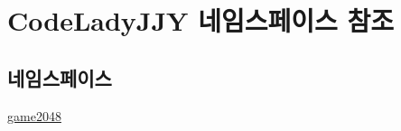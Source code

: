 \hypertarget{namespace_code_lady_j_j_y}{}\section{Code\+Lady\+J\+JY 네임스페이스 참조}
\label{namespace_code_lady_j_j_y}
\subsection*{네임스페이스}
\begin{DoxyCompactItemize}
\item 
 \hyperlink{namespace_code_lady_j_j_y_1_1game2048}{game2048}
\end{DoxyCompactItemize}
